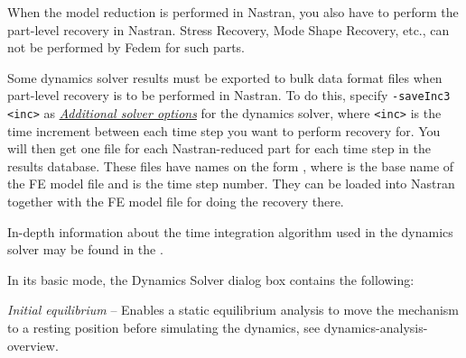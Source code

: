 {When the model reduction is performed in Nastran, you also have to perform the
part-level recovery in Nastran. Stress Recovery, Mode Shape Recovery, etc.,
can not be performed by Fedem for such parts.

Some dynamics solver results must be exported to bulk data format files when
part-level recovery is to be performed in Nastran.
To do this, specify {\tt -saveInc3 \textless inc\textgreater} as
\protect\hyperlink{additional-solver-options}{\sl Additional solver options}
for the dynamics solver, where
{\tt\textless inc\textgreater} is the time increment between each time step you
want to perform recovery for. You will then get one file for each
Nastran-reduced part for each time step in the results database.
These files have names on the form
,
where  is the base name of the FE model file
and  is the time step number.
They can be loaded into Nastran together with the FE model file for doing
the recovery there.




In-depth information about the time integration algorithm used in the dynamics
solver may be found in the .



In its basic mode, the Dynamics Solver dialog box contains the following:

\noindent
\begin{minipage}{0.5\textwidth}
  \raggedright
  \begin{bulletlist}
    \setlength\itemsep{1mm}
  \item{\sl Initial equilibrium} --
    Enables a static equilibrium analysis to move the mechanism to a resting
    position before simulating the dynamics, see
                  {dynamics-analysis-overview}.


\end{bulletlist}
\end{minipage}}
